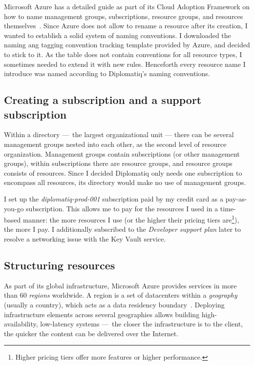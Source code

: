 Microsoft Azure has a detailed guide as part of its Cloud Adoption Framework on how to name management groups, subscriptions, resource groups, and resources themselves~\cite{azure-naming}. Since Azure does not allow to rename a resource after its creation, I wanted to establish a solid system of naming conventions. I downloaded the naming ang tagging convention tracking template provided by Azure, and decided to stick to it. As the table does not contain conventions for all resource types, I sometimes needed to extend it with new rules. Henceforth every resource name I introduce was named according to Diplomatiq's naming conventions.

\subsection{Creating a subscription and a support subscription}

Within a directory — the largest organizational unit — there can be several management groups nested into each other, as the second level of resource organization. Management groups contain subscriptions (or other management groups), within subscriptions there are resource groups, and resource groups consists of resources. Since I decided Diplomatiq only needs one subscription to encompass all resources, its directory would make no use of management groups.

I set up the \emph{diplomatiq-prod-001} subscription paid by my credit card as a pay-as-you-go subscription. This allows me to pay for the resources I used in a time-based manner: the more resources I use (or the higher their pricing tiers are\footnote{Higher pricing tiers offer more features or higher performance.}), the more I pay. I additionally subscribed to the \emph{Developer support plan} later to resolve a networking issue with the Key Vault service.

\subsection{Structuring resources}

As part of its global infrastructure, Microsoft Azure provides services in more than 60 \emph{regions} worldwide. A region is a set of datacenters within a \emph{geography} (usually a country), which acts as a data residency boundary~\cite{azure-global-infrastructure}. Deploying infrastructure elements across several geographies allows building high-availability, low-latency systems — the closer the infrastructure is to the client, the quicker the content can be delivered over the Internet.

